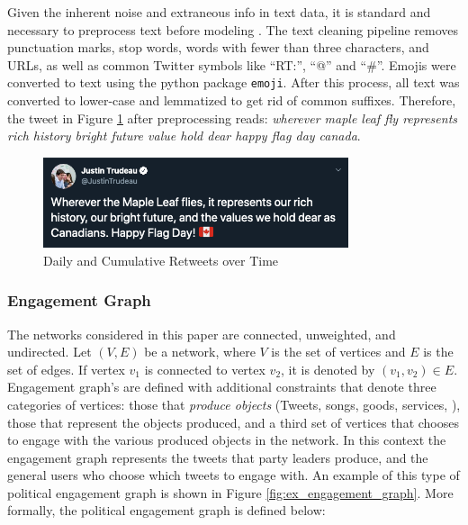 Given the inherent noise and extraneous info in text data, it is
standard and necessary to preprocess text before modeling
\cite{sapul2017trending}. The text cleaning pipeline removes punctuation marks,
stop words, words with fewer than three characters, and URLs, as well as common
Twitter symbols like ``RT:'', ``@'' and ``\#''. Emojis were converted to text
using the python package \texttt{emoji}. After this process, all text was
converted to lower-case and lemmatized to get rid of common suffixes. Therefore,
the tweet in Figure \ref{fig:tweet_ex} after preprocessing reads: \emph{wherever
maple leaf fly represents rich history bright future value hold dear happy flag
day canada}.

\begin{figure}[h!]
  \centering
  \includegraphics[width=0.8\textwidth]{figures/tweet_ex}
  \caption[Daily and Cumulative Retweets over Time]{Daily and Cumulative Retweets over Time}
  \label{fig:tweet_ex}
\end{figure}

\subsubsection{Engagement Graph}

The networks considered in this paper are connected, unweighted, and undirected.
Let $(V,E)$ be a network, where $V$ is the set of vertices and $E$ is the set of
edges. If vertex $v_1$ is connected to vertex $v_2$, it is denoted by
$(v_1,v_2)\in E$. Engagement graph's are defined with additional constraints
that denote three categories of vertices: those that \emph{produce objects}
(Tweets, songs, goods, services, \etc), those that represent the objects
produced, and a third set of vertices that chooses to engage with the various
produced objects in the network. In this context the engagement graph represents
the tweets that party leaders produce, and the general users who choose which
tweets to engage with. An example of this type of political engagement graph is
shown in Figure \ref{fig:ex_engagement_graph}. More formally, the political
engagement graph is defined below:

